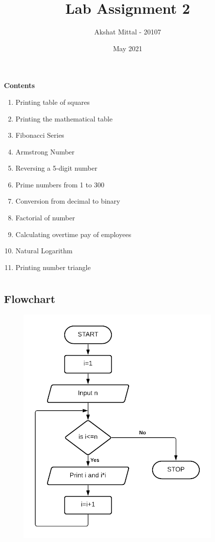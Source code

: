 \documentclass[12pt]{article}
\title{Lab Assignment 2}
\author{Akshat Mittal - 20107}
\date{May 2021}
\begin{document}
\maketitle
\vspace{7mm}
\textbf{Contents}
\vspace{7mm}
\begin{enumerate}
    \item Printing table of squares
    \item Printing the mathematical table
    \item Fibonacci Series
    \item Armstrong Number
    \item Reversing a 5-digit number
    \item Prime numbers from 1 to 300
    \item Conversion from decimal to binary
    \item Factorial of number
    \item Calculating overtime pay of employees
    \item Natural Logarithm
    \item Printing number triangle
\end{enumerate}
\newpage
\section{}
\subsection{Flowchart}
\begin{figure}[h]
    \centering
    \includegraphics[width=0.9\textwidth]{Flowchart01.png}
\end{figure}
\newpage
\end{document}
